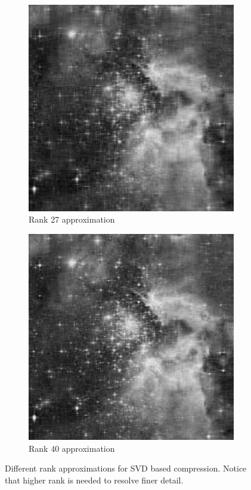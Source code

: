\begin{figure}
\begin{subfigure}[b]{.49\textwidth}
\centering
\includegraphics[width=\textwidth]{rank27.png}
\caption{Rank 27 approximation}
\end{subfigure}
\begin{subfigure}[b]{.49\textwidth}
\centering
\includegraphics[width=\textwidth]{rank40.png}
\caption{Rank 40 approximation}
\end{subfigure}
\caption{Different rank approximations for SVD based compression.  Notice that higher rank is needed to resolve finer detail.}
\label{fig:rankvalues}
\end{figure}

